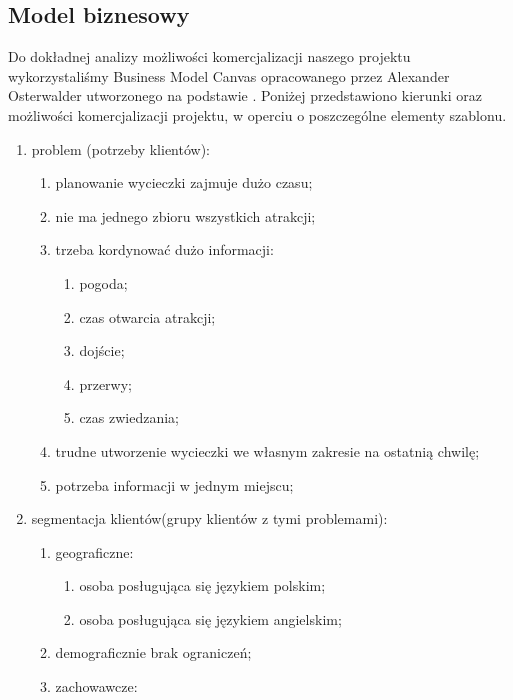 \subsection{Model biznesowy}
\label{sec:aspekty-biznesowy}

Do dokładnej analizy możliwości komercjalizacji naszego projektu wykorzystaliśmy Business Model Canvas opracowanego przez Alexander Osterwalder  utworzonego na podstawie \cite{bmc}.
Poniżej przedstawiono kierunki oraz możliwości komercjalizacji projektu, w operciu o poszczególne elementy szablonu.
\begin{enumerate}[label=\Roman*.]
    \item problem (potrzeby klientów):
    \begin{enumerate}[label=\alph*.]
        \item planowanie wycieczki zajmuje dużo czasu;
        \item nie ma jednego zbioru wszystkich atrakcji;
        \item trzeba kordynować dużo informacji:
        \begin{enumerate}[label=\roman*.]
            \item pogoda;
            \item czas otwarcia atrakcji;
            \item dojście;
            \item przerwy;
            \item czas zwiedzania;
        \end{enumerate}
        \item trudne utworzenie wycieczki we własnym zakresie na ostatnią chwilę;
        \item potrzeba informacji w jednym miejscu;
    \end{enumerate}
    \item segmentacja klientów(grupy klientów z tymi problemami):
    \begin{enumerate}[label=\alph*.]
        \item geograficzne:
        \begin{enumerate}[label=\roman*.]
            \item osoba posługująca się językiem polskim;
            \item osoba posługująca się językiem angielskim;
        \end{enumerate}
        \item demograficznie brak ograniczeń;
        \item zachowawcze:
        \begin{enumerate}[label=\roman*.]

\end{enumerate}
\end{enumerate}
\end{enumerate}
